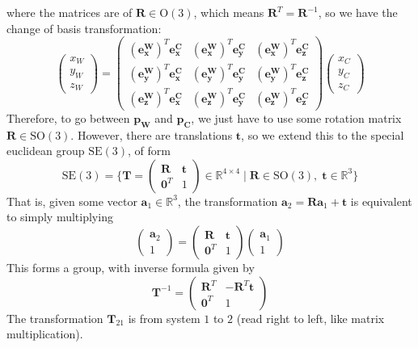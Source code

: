 \documentclass{article}
\theoremstyle{definition}
\theoremstyle{remark}
\theoremstyle{definition}
\begin{document}
where the matrices are of $\mathbf{R} \in \mathrm{O}(3)$, which means $\mathbf{R}^T = \mathbf{R}^{-1}$, so we have the change of basis transformation: 
\[\begin{pmatrix} x_W \\ y_W \\ z_W \end{pmatrix} = \begin{pmatrix} (\mathbf{e_x^W})^T \mathbf{e_x^C} & (\mathbf{e_x^W})^T \mathbf{e_y^C} & (\mathbf{e_x^W})^T \mathbf{e_z^C} \\ 
(\mathbf{e_y^W})^T \mathbf{e_x^C} & (\mathbf{e_y^W})^T \mathbf{e_y^C} & (\mathbf{e_y^W})^T \mathbf{e_z^C} \\ 
(\mathbf{e_z^W})^T \mathbf{e_x^C} & (\mathbf{e_z^W})^T \mathbf{e_y^C} & (\mathbf{e_z^W})^T \mathbf{e_z^C}
\end{pmatrix} \begin{pmatrix} x_C \\ y_C \\ z_C \end{pmatrix} \]
Therefore, to go between $\mathbf{p_W}$ and $\mathbf{p_C}$, we just have to use some rotation matrix $\mathbf{R} \in \mathrm{SO}(3)$. However, there are translations $\mathbf{t}$, so we extend this to the special euclidean group $\mathrm{SE}(3)$, of form 
\[\mathrm{SE}(3) = \bigg\{ \mathbf{T} = \begin{pmatrix} \mathbf{R} & \mathbf{t} \\ \mathbf{0}^T & 1 \end{pmatrix} \in \mathbb{R}^{4 \times 4} \mid \mathbf{R} \in \mathrm{SO}(3), \; \mathbf{t} \in \mathbb{R}^3 \bigg\}\]
That is, given some vector $\mathbf{a}_1 \in \mathbb{R}^3$, the transformation $\mathbf{a}_2 = \mathbf{R} \mathbf{a}_1 + \mathbf{t}$ is equivalent to simply multiplying \
\[\begin{pmatrix} \mathbf{a}_2 \\ 1 \end{pmatrix} = \begin{pmatrix} \mathbf{R} & \mathbf{t} \\ \mathbf{0}^T & 1 \end{pmatrix} \begin{pmatrix} \mathbf{a}_1 \\ 1 \end{pmatrix} \]
This forms a group, with inverse formula given by 
\[\mathbf{T}^{-1} = \begin{pmatrix} \mathbf{R}^T & -\mathbf{R}^T \mathbf{t} \\ \mathbf{0}^T & 1 \end{pmatrix}\]
The transformation $\mathbf{T}_{21}$ is from system $1$ to $2$ (read right to left, like matrix multiplication). 
\end{document}
